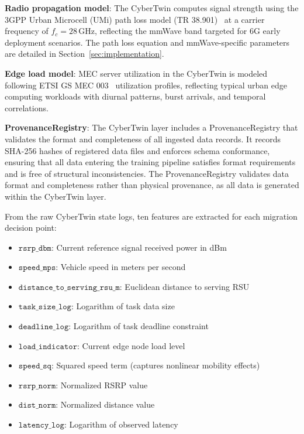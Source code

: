 \documentclass[journal,twoside]{IEEEtran}
\begin{document}
\textbf{Radio propagation model}: The CyberTwin computes signal strength using the 3GPP Urban Microcell (UMi) path loss model (TR 38.901)~\cite{3gpp2018ts} at a carrier frequency of $f_c = 28$\,GHz, reflecting the mmWave band targeted for 6G early deployment scenarios. The path loss equation and mmWave-specific parameters are detailed in Section~\ref{sec:implementation}.

\textbf{Edge load model}: MEC server utilization in the CyberTwin is modeled following ETSI GS MEC 003~\cite{etsi_mec003} utilization profiles, reflecting typical urban edge computing workloads with diurnal patterns, burst arrivals, and temporal correlations.

\textbf{ProvenanceRegistry}: The CyberTwin layer includes a ProvenanceRegistry that validates the format and completeness of all ingested data records. It records SHA-256 hashes of registered data files and enforces schema conformance, ensuring that all data entering the training pipeline satisfies format requirements and is free of structural inconsistencies. The ProvenanceRegistry validates data format and completeness rather than physical provenance, as all data is generated within the CyberTwin layer.

From the raw CyberTwin state logs, ten features are extracted for each migration decision point:

\begin{itemize}
    \item $\texttt{rsrp\_dbm}$: Current reference signal received power in dBm
    \item $\texttt{speed\_mps}$: Vehicle speed in meters per second
    \item $\texttt{distance\_to\_serving\_rsu\_m}$: Euclidean distance to serving RSU
    \item $\texttt{task\_size\_log}$: Logarithm of task data size
    \item $\texttt{deadline\_log}$: Logarithm of task deadline constraint
    \item $\texttt{load\_indicator}$: Current edge node load level
    \item $\texttt{speed\_sq}$: Squared speed term (captures nonlinear mobility effects)
    \item $\texttt{rsrp\_norm}$: Normalized RSRP value
    \item $\texttt{dist\_norm}$: Normalized distance value
    \item $\texttt{latency\_log}$: Logarithm of observed latency
\end{itemize}
\end{document}
